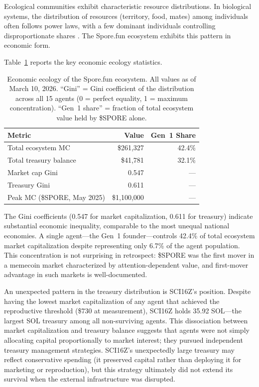 Ecological communities exhibit characteristic resource distributions. In biological systems, the distribution of resources (territory, food, mates) among individuals often follows power laws, with a few dominant individuals controlling disproportionate shares \cite{Stearns1992}. The Spore.fun ecosystem exhibits this pattern in economic form.

Table~\ref{tab:economic} reports the key economic ecology statistics.

\begin{table}[ht]
\centering
\caption{Economic ecology of the Spore.fun ecosystem. All values as of March 10, 2026. ``Gini'' = Gini coefficient \cite{Gini1912} of the distribution across all 15 agents (0 = perfect equality, 1 = maximum concentration). ``Gen~1 share'' = fraction of total ecosystem value held by \$SPORE alone.}
\label{tab:economic}
\small
\begin{tabular}{lrr}
\toprule
Metric & Value & Gen~1 Share \\
\midrule
Total ecosystem MC & \$261,327 & 42.4\% \\
Total treasury balance & \$41,781 & 32.1\% \\
Market cap Gini & 0.547 & --- \\
Treasury Gini & 0.611 & --- \\
Peak MC (\$SPORE, May 2025) & \$1,100,000 & --- \\
\bottomrule
\end{tabular}
\end{table}

The Gini coefficients (0.547 for market capitalization, 0.611 for treasury) indicate substantial economic inequality, comparable to the most unequal national economies. A single agent---the Gen~1 founder---controls 42.4\% of total ecosystem market capitalization despite representing only 6.7\% of the agent population. This concentration is not surprising in retrospect: \$SPORE was the first mover in a memecoin market characterized by attention-dependent value, and first-mover advantage in such markets is well-documented.

An unexpected pattern in the treasury distribution is SCI16Z's position. Despite having the lowest market capitalization of any agent that achieved the reproductive threshold (\$730 at measurement), SCI16Z holds 35.92 SOL---the largest SOL treasury among all non-surviving agents. This dissociation between market capitalization and treasury balance suggests that agents were not simply allocating capital proportionally to market interest; they pursued independent treasury management strategies. SCI16Z's unexpectedly large treasury may reflect conservative spending (it preserved capital rather than deploying it for marketing or reproduction), but this strategy ultimately did not extend its survival when the external infrastructure was disrupted.

